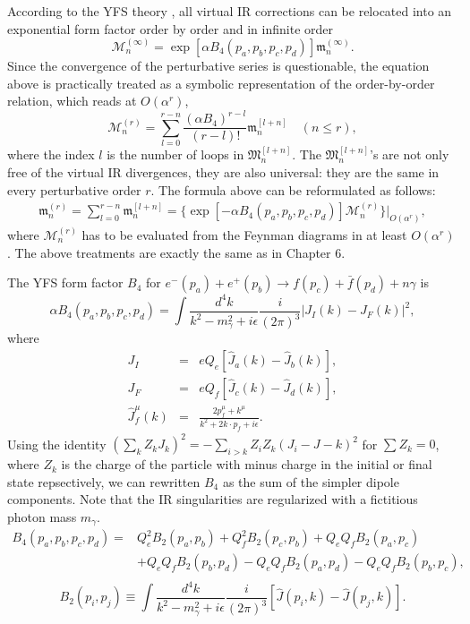 According to the YFS theory \cite{YFS}, all virtual IR corrections can be relocated into an exponential form factor order by order and in infinite order
\begin{equation}
\mathcal{M}^{(\infty)}_n=\exp[\alpha B_4(p_a,p_b,p_c,p_d)]\mathfrak{m}^{(\infty)}_n.
\end{equation}
Since the convergence of the perturbative series is questionable, the equation above is practically treated as a symbolic representation of the order-by-order relation, which reads at $O(\alpha^r)$,
\begin{equation}
\mathcal{M}^{(r)}_n=\sum_{l=0}^{r-n}\frac{(\alpha B_4)^{r-l}}{(r-l)!}\mathfrak{m}^{[l+n]}_n\quad {(n\leq r)},
\end{equation}
where the index $l$ is the number of loops in $\mathfrak{M}^{[l+n]}_n$. The $\mathfrak{M}_n^{[l+n]}$'s are not only free of the virtual IR divergences, they are also universal: they are the same in every perturbative order $r$. The formula above can be reformulated as follows:
\begin{eqnarray}
\mathfrak{m}^{(r)}_n=\sum_{l=0}^{r-n}\mathfrak{m}_n^{[l+n]}=\{\exp[-\alpha B_4(p_a,p_b,p_c,p_d)]\mathcal{M}^{(r)}_n\}|_{O(\alpha^r)},
\end{eqnarray}
where $\mathcal{M}^{(r)}_n$ has to be evaluated from the Feynman diagrams in at least $O(\alpha^r)$. The above treatments are exactly the same as in Chapter 6.

The YFS form factor $B_4$ for $e^-(p_a)+e^+(p_b)\to f(p_c)+\bar{f}(p_d)+n\gamma$ is
\begin{equation}
\alpha B_4(p_a,p_b,p_c,p_d)=\int \frac{d^4k}{k^2-m_\gamma^2+i\epsilon}\frac{i}{(2\pi)^3}\left|J_I(k)-J_F(k)\right|^2,
\end{equation}
where
\begin{eqnarray}
J_I&=&eQ_e[\hat{J}_a(k)-\hat{J}_b(k)],\nonumber\\
J_F&=&eQ_f[\hat{J}_c(k)-\hat{J}_d(k)],\nonumber\\
\hat{J}_f^\mu(k)&=&\frac{2p_f^\mu+k^\mu}{k^2+2k\cdot p_f+i\epsilon}.
\end{eqnarray}
Using the identity $(\sum_kZ_kJ_k)^2=-\sum_{i>k}Z_iZ_k(J_i-J-k)^2$ for $\sum Z_k=0$, where $Z_k$ is the charge of the particle with minus charge in the initial or final state repsectively, we can rewritten $B_4$ as the sum of the simpler dipole components.
Note that the IR singularities are regularized with a fictitious photon mass $m_\gamma$. 
\begin{align}
B_4(p_a,p_b,p_c,p_d)=&Q^2_eB_2(p_a,p_b)+Q^2_fB_2(p_c,p_b)+Q_eQ_fB_2(p_a,p_c)\nonumber\\
&+Q_eQ_fB_2(p_b,p_d)-Q_eQ_fB_2(p_a,p_d)-Q_eQ_fB_2(p_b,p_c),\nonumber\\
\end{align}
\begin{equation}
B_2(p_i,p_j)\equiv\int\frac{d^4k}{k^2-m^2_\gamma+i\epsilon}\frac{i}{(2\pi)^3}[\hat{J}(p_i,k)-\hat{J}(p_j,k)].
\end{equation}

